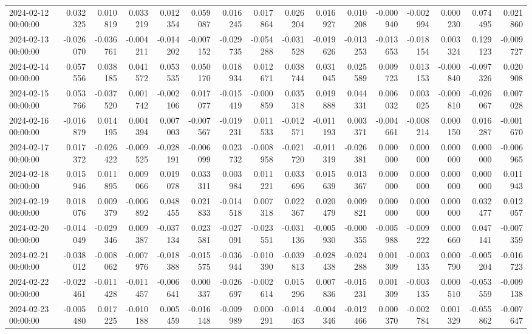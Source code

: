 \begin{tabular}{lrrrrrrrrrrrrrrr}
2024-02-12 00:00:00 & 0.032325 & 0.010819 & 0.033219 & 0.012354 & 0.059087 & 0.016245 & 0.017864 & 0.026204 & 0.016927 & 0.010208 & -0.000940 & -0.002994 & 0.000230 & 0.074495 & 0.021860 \\
2024-02-13 00:00:00 & -0.026070 & -0.036761 & -0.004211 & -0.014202 & -0.007152 & -0.029735 & -0.054288 & -0.031528 & -0.019626 & -0.013253 & -0.013653 & -0.018154 & 0.003324 & 0.129123 & -0.009727 \\
2024-02-14 00:00:00 & 0.057556 & 0.038185 & 0.041572 & 0.053535 & 0.050170 & 0.018934 & 0.012671 & 0.038744 & 0.031045 & 0.025589 & 0.009723 & 0.013153 & -0.000840 & -0.097326 & 0.020908 \\
2024-02-15 00:00:00 & 0.053766 & -0.037520 & 0.001742 & -0.002106 & 0.017077 & -0.015419 & -0.000859 & 0.035318 & 0.019888 & 0.044331 & 0.006032 & 0.003025 & -0.000810 & -0.026067 & 0.007028 \\
2024-02-16 00:00:00 & -0.016879 & 0.014195 & 0.004394 & 0.007003 & -0.007567 & -0.019231 & 0.011533 & -0.012571 & -0.011193 & 0.003371 & -0.004661 & -0.008214 & 0.000150 & 0.016287 & -0.001670 \\
2024-02-17 00:00:00 & 0.017372 & -0.026422 & -0.009525 & -0.028191 & -0.006099 & 0.023732 & -0.008958 & -0.021720 & -0.011319 & -0.026381 & 0.000000 & 0.000000 & 0.000000 & 0.000000 & -0.006965 \\
2024-02-18 00:00:00 & 0.015946 & 0.011895 & 0.009066 & 0.019078 & 0.033311 & 0.003984 & 0.011221 & 0.033696 & 0.015639 & 0.013367 & 0.000000 & 0.000000 & 0.000000 & 0.000000 & 0.011943 \\
2024-02-19 00:00:00 & 0.018076 & 0.009379 & -0.006892 & 0.048455 & 0.021833 & -0.014518 & 0.007318 & 0.022367 & 0.020479 & 0.009821 & 0.000000 & 0.000000 & 0.000000 & 0.032477 & 0.012057 \\
2024-02-20 00:00:00 & -0.014049 & -0.029346 & 0.009387 & -0.037134 & 0.023581 & -0.027091 & -0.023551 & -0.031136 & -0.005930 & -0.000355 & -0.005988 & -0.009222 & 0.000660 & 0.047141 & -0.007359 \\
2024-02-21 00:00:00 & -0.038012 & -0.008062 & -0.007976 & -0.018388 & -0.015575 & -0.036944 & -0.010390 & -0.039813 & -0.028438 & -0.024288 & 0.001309 & -0.003135 & 0.000790 & -0.005204 & -0.016723 \\
2024-02-22 00:00:00 & -0.022461 & -0.011428 & -0.011457 & -0.006641 & 0.000337 & -0.026697 & -0.002614 & 0.015296 & 0.007836 & -0.015231 & 0.001309 & -0.003135 & 0.000510 & -0.053559 & -0.009138 \\
2024-02-23 00:00:00 & -0.005480 & 0.017225 & -0.010188 & 0.005459 & -0.016148 & -0.009989 & 0.000291 & -0.014463 & -0.004346 & -0.012466 & 0.000370 & -0.002784 & 0.001329 & -0.055862 & -0.007647 \\

\end{tabular}
